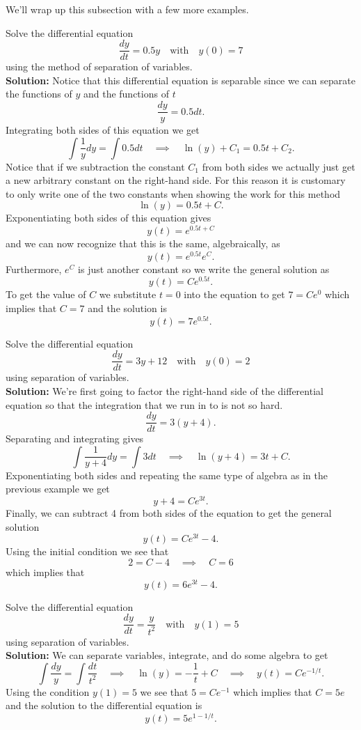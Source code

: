 We'll wrap up this subsection with a few more examples.
\begin{example}
    Solve the differential equation 
    \[ \frac{dy}{dt} = 0.5 y \quad \text{with} \quad y(0) = 7 \]
    using the method of separation of variables.\\{\bf Solution:} Notice that this
    differential equation is separable since we can separate the functions of $y$ and the
    functions of $t$
    \[ \frac{dy}{y} = 0.5 dt. \]
    Integrating both sides of this equation we get
    \[ \int \frac{1}{y} dy = \int 0.5 dt \quad \implies \quad \ln(y) + C_1 = 0.5 t + C_2.
    \]
    Notice that if we subtraction the constant $C_1$ from both sides we actually just get
    a new arbitrary constant on the right-hand side.  For this reason it is customary to
    only write one of the two constants when showing the work for this method
    \[ \ln(y) = 0.5 t + C. \]
    Exponentiating both sides of this equation gives 
    \[ y(t) = e^{0.5 t + C} \]
    and we can now recognize that this is the same, algebraically, as
    \[ y(t) = e^{0.5t} e^C.  \]
    Furthermore, $e^C$ is just another constant so we write the general solution as 
    \[ y(t) = Ce^{0.5t}. \]
    To get the value of $C$ we substitute $t=0$ into the equation to get $7 = Ce^0$ which
    implies that $C= 7$ and the solution is 
    \[ y(t) = 7e^{0.5t}. \]
\end{example}

\begin{example}
    Solve the differential equation 
    \[ \frac{dy}{dt} = 3y+12 \quad \text{with} \quad y(0) = 2 \]
    using separation of variables. \\{\bf Solution:} We're first going to factor the
    right-hand side of the differential equation so that the integration that we run in to
    is not so hard.
    \[ \frac{dy}{dt} = 3(y+4). \]
    Separating and integrating gives
    \[ \int \frac{1}{y+4} dy = \int 3dt \quad \implies \quad \ln(y+4) = 3t+C. \]
    Exponentiating both sides and repeating the same type of algebra as in the previous
    example we get
    \[ y + 4 = Ce^{3t}. \]
    Finally, we can subtract 4 from both sides of the equation to get the general solution
    \[ y(t) = Ce^{3t} - 4. \]
    Using the initial condition we see that 
    \[ 2 = C - 4 \quad \implies \quad C=6 \]
    which implies that 
    \[ y(t) = 6 e^{3t} - 4. \]
\end{example}

\begin{example}
    Solve the differential equation
    \[ \frac{dy}{dt} = \frac{y}{t^2} \quad \text{with} \quad y(1) = 5 \]
    using separation of variables.  \\{\bf Solution:} We can separate variables,
    integrate, and do some algebra to get
    \[ \int \frac{dy}{y} = \int \frac{dt}{t^2} \quad \implies \quad \ln(y) =
    -\frac{1}{t} + C \quad \implies \quad y(t) = Ce^{-1/t}. \]
    Using the condition $y(1) = 5$ we see that $5 = Ce^{-1}$ which implies that $C = 5e$
    and the solution to the differential equation is 
    \[ y(t) = 5e^{1-1/t}. \]
\end{example}

